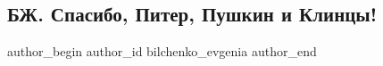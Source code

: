  
 
 
 
 
 
\subsection{БЖ. Спасибо, Питер, Пушкин и Клинцы!}
\label{sec:25_05_2021.fb.bilchenko_evgenia.4.spasibo_piter_pushkin_i_klincy}
\ifcmt
 author_begin
   author_id bilchenko_evgenia
 author_end
\fi

